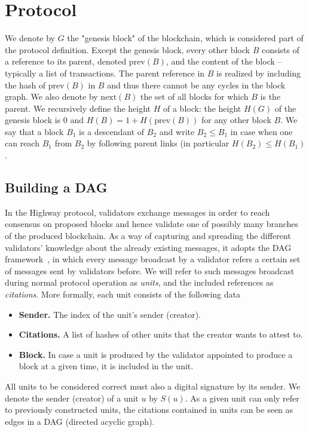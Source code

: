 \documentclass[12pt, fleqn]{article}
\begin{document}
\section{Protocol}
We denote by $G$ the "genesis block" of the blockchain, which is considered part of the protocol definition.
%
Except the genesis block, every other block $B$ consists of a reference to its parent, denoted $\mathrm{prev}(B)$, and the content of the block  -- typically a list of transactions.
%
The parent reference in $B$ is realized by including the hash of $\mathrm{prev}(B)$ in $B$ and thus there cannot be any cycles in the block graph.
%
We also denote by $\mathrm{next}(B)$ the set of all blocks for which $B$ is the parent.
%
We recursively define the height $H$ of a block: the height $H(G)$ of the genesis block is $0$ and $H(B)=1+H(\mathrm{prev}(B))$ for any other block $B$.
%
We say that a block $B_1$ is a descendant of $B_2$ and write $B_2\leq B_1$ in case when one can reach $B_1$ from $B_2$ by following parent links (in particular $H(B_2)\leq H(B_1)$.

\subsection{Building a DAG}

In the Highway protocol, validators exchange messages in order to reach consensus on proposed blocks and hence validate one of possibly many branches of the produced blockchain.
%
As a way of capturing and spreading the different validators' knowledge about the already existing messages, it adopts the DAG framework~\cite{moser1999byzantine,zamfir2018casper,baird2016hashgraph,GLSS19}, in which every message broadcast by a validator refers a certain set of  messages sent by validators before.
%
We will refer to such messages broadcast during normal protocol operation as \emph{units}, and the included references as \emph{citations}. More formally, each unit consists of the following data
\begin{itemize}
    \item {\bf Sender.} The index of the unit's sender (creator).
    \item {\bf Citations.} A list of hashes of other units that the creator wants to attest to. 
    \item {\bf Block.} In case a unit is produced by the validator appointed to produce a block at a given time, it is included in the unit. 
\end{itemize}

All units to be considered correct must also a digital signature by its sender.
%
We denote the sender (creator) of a unit $u$ by $S(u)$.
%
As a given unit can only refer to previously constructed units, the citations contained in units can be seen as edges in a DAG (directed acyclic graph).
\end{document}
